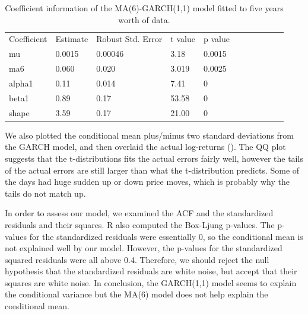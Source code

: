 \documentclass[12pt]{article}
\begin{document}
\begin{table}[h!]
\begin{center}
\begin{tabular}{|l | l | l | l | l | l | l | l | l | l | l |}
\hline
Coefficient & Estimate & Robust Std. Error & t value & p value\\
mu     & 0.0015 & 0.00046 & 3.18 & 0.0015\\
ma6 & 0.060 & 0.020 & 3.019 & 0.0025\\
alpha1 & 0.11 & 0.014 & 7.41 & 0\\
beta1  & 0.89 & 0.17 & 53.58 & 0\\
shape & 3.59 & 0.17 & 21.00 & 0\\
\hline
\end{tabular}
\end{center}
\caption{Coefficient information of the MA(6)-GARCH(1,1) model fitted to five years worth of data.}
\label{tab:garch_22_coeffs}
\end{table}


We also plotted the conditional mean plus/minus two standard deviations from the GARCH model, and then overlaid the actual log-returns (). The QQ plot suggests that the t-distributions fits the actual errors fairly well, however the tails of the actual errors are still larger than what the t-distribution predicts. Some of the days had huge sudden up or down price moves, which is probably why the tails do not match up.

In order to assess our model, we examined the ACF and the standardized residuals and their squares. R also computed the Box-Ljung p-values. The p-values for the standardized residuals were essentially 0, so the conditional mean is not explained well by our model. However, the p-values for the standardized squared residuals were all above 0.4. Therefore, we should reject the null hypothesis that the standardized residuals are white noise, but accept that their squares are white noise. In conclusion, the GARCH(1,1) model seems to explain the conditional variance but the MA(6) model does not help explain the conditional mean.
\end{document}
